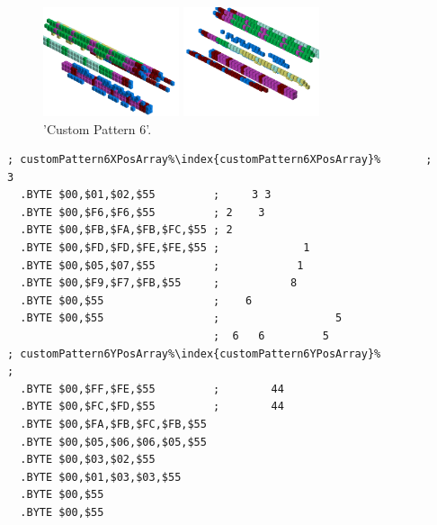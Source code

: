 \begin{minipage}[b]{0.54\linewidth}
\begin{figure}[H]
    \centering
    \begin{adjustbox}{width=6cm,margin=0cm 0cm}
      \includegraphics[width=4cm]{src/patterns/pattern14-45.png}%
    \end{adjustbox}
    \begin{adjustbox}{width=6cm,margin=0cm -1.8cm}
      \includegraphics[width=4cm]{src/patterns/pattern14-225.png}%
    \end{adjustbox}
\caption{'Custom Pattern 6'.}
\end{figure}
\end{minipage}
\begin{minipage}[b]{0.44\linewidth}
\begin{lrbox}{\mybox}%
\begin{lstlisting}[basicstyle=\ttfamily\tiny,escapechar=\%]
; customPattern6XPosArray%\index{customPattern6XPosArray}%       ;      3            
  .BYTE $00,$01,$02,$55         ;     3 3           
  .BYTE $00,$F6,$F6,$55         ; 2    3            
  .BYTE $00,$FB,$FA,$FB,$FC,$55 ; 2                 
  .BYTE $00,$FD,$FD,$FE,$FE,$55 ;             1     
  .BYTE $00,$05,$07,$55         ;            1      
  .BYTE $00,$F9,$F7,$FB,$55     ;           8       
  .BYTE $00,$55                 ;    6              
  .BYTE $00,$55                 ;                  5
                                ;  6   6         5  
; customPattern6YPosArray%\index{customPattern6YPosArray}%             ;                   
  .BYTE $00,$FF,$FE,$55         ;        44         
  .BYTE $00,$FC,$FD,$55         ;        44         
  .BYTE $00,$FA,$FB,$FC,$FB,$55
  .BYTE $00,$05,$06,$06,$05,$55
  .BYTE $00,$03,$02,$55
  .BYTE $00,$01,$03,$03,$55
  .BYTE $00,$55
  .BYTE $00,$55
\end{lstlisting}
\end{lrbox}%
\scalebox{0.9}{\usebox{\mybox}}

\end{minipage}
